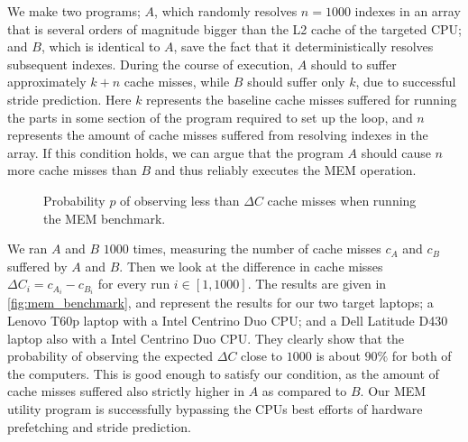 We make two programs; \(A\), which randomly resolves \(n = 1000\) indexes in an array that is several orders of magnitude bigger than the L2 cache of the targeted CPU; and \(B\), which is identical to \(A\), save the fact that it deterministically resolves subsequent indexes.
During the course of execution, \(A\) should to suffer approximately \(k+n\) cache misses, while \(B\) should suffer only \(k\), due to successful stride prediction.
Here \(k\) represents the baseline cache misses suffered for running the parts in some section of the program required to set up the loop, and \(n\) represents the amount of cache misses suffered from resolving indexes in the array.
If this condition holds, we can argue that the program \(A\) should cause \(n\) more cache misses than \(B\) and thus reliably executes the MEM operation. 

\begin{figure}
    \centering
    \caption{Probability \(p\) of observing less than \(\Delta C\) cache misses when running the MEM benchmark.}
    \label{fig:mem_benchmark}
\end{figure}

We ran \(A\) and \(B\) \(1000\) times, measuring the number of cache misses \(c_A\) and \(c_B\) suffered by \(A\) and \(B\).
Then we look at the difference in cache misses \(\Delta C_i = c_{A_i} - c_{B_i}\) for every run \(i \in [1, 1000]\).
The results are given in \autoref{fig:mem_benchmark}, and represent the results for our two target laptops; a Lenovo T60p laptop with a Intel Centrino Duo \gls{CPU}; and a Dell Latitude D430 laptop also with a Intel Centrino Duo \gls{CPU}.
They clearly show that the probability of observing the expected \(\Delta C\) close to \(1000\) is about \(90\%\) for both of the computers.
This is good enough to satisfy our condition, as the amount of cache misses suffered also strictly higher in \(A\) as compared to \(B\).
Our MEM utility program is successfully bypassing the \gls{CPU}s best efforts of hardware prefetching and stride prediction.




